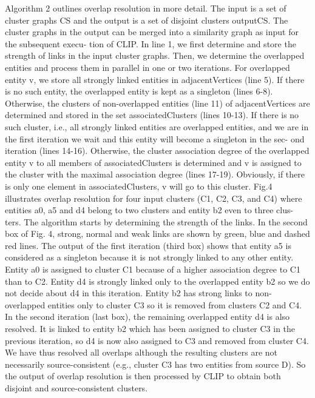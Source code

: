 \documentclass[runningheads]{llncs}
\begin{document}
Algorithm 2 outlines overlap resolution in more detail. The input is a set of cluster graphs CS and the output is a set of disjoint clusters outputCS. The cluster graphs in the output can be merged into a similarity graph as input for the subsequent execu- tion of CLIP. In line 1, we first determine and store the strength of links in the input cluster graphs. Then, we determine the overlapped entities and process them in parallel in one or two iterations. For overlapped entity v, we store all strongly linked entities in adjacentVertices (line 5). If there is no such entity, the overlapped entity is kept as a singleton (lines 6-8). Otherwise, the clusters of non-overlapped entities (line 11) of adjacentVertices are determined and stored in the set associatedClusters (lines 10-13). If there is no such cluster, i.e., all strongly linked entities are overlapped entities, and we are in the first iteration we wait and this entity will become a singleton in the sec- ond iteration (lines 14-16). Otherwise, the cluster association degree of the overlapped entity v to all members of associatedClusters is determined and v is assigned to the
cluster with the maximal association degree (lines 17-19). Obviously, if there is only one element in associatedClusters, v will go to this cluster.
Fig.4 illustrates overlap resolution for four input clusters (C1, C2, C3, and C4) where entities a0, a5 and d4 belong to two clusters and entity b2 even to three clus- ters. The algorithm starts by determining the strength of the links. In the second box of Fig. 4, strong, normal and weak links are shown by green, blue and dashed red lines. The output of the first iteration (third box) shows that entity a5 is considered as a singleton because it is not strongly linked to any other entity. Entity a0 is assigned to cluster C1 because of a higher association degree to C1 than to C2. Entity d4 is strongly linked only to the overlapped entity b2 so we do not decide about d4 in this iteration. Entity b2 has strong links to non-overlapped entities only to cluster C3 so it is removed from clusters C2 and C4. In the second iteration (last box), the remaining overlapped entity d4 is also resolved. It is linked to entity b2 which has been assigned to cluster C3 in the previous iteration, so d4 is now also assigned to C3 and removed from cluster C4. We have thus resolved all overlaps although the resulting clusters are not necessarily source-consistent (e.g., cluster C3 has two entities from source D). So the output of overlap resolution is then processed by CLIP to obtain both disjoint and source-consistent clusters.
\end{document}
